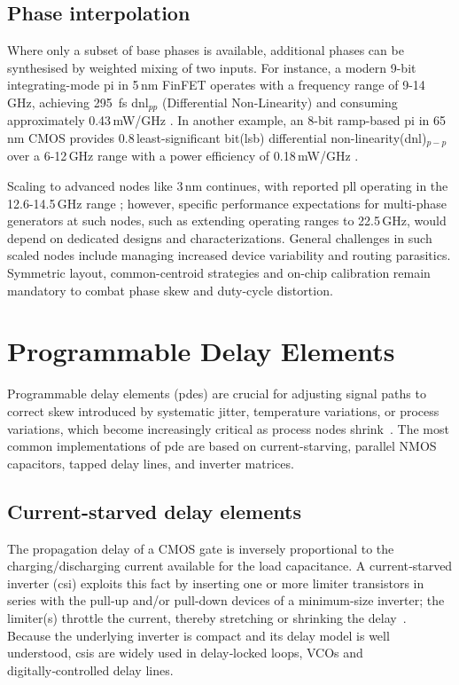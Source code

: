 \subsection{Phase interpolation}
Where only a subset of base phases is available, additional phases can be synthesised by weighted mixing of two inputs.
For instance, a modern 9-bit integrating-mode \gls{pi} in 5\,nm FinFET operates with a frequency range of 9-14\,GHz, achieving \SI{295}{\femto\second} \gls{dnl}$_{pp}$ (Differential Non-Linearity) and consuming approximately 0.43\,mW/GHz \cite{Mishra2022ISSCC}. In another example, an 8-bit ramp-based \gls{pi} in 65\,nm CMOS provides 0.8\,least-significant bit(\gls{lsb}) differential non-linearity(\gls{dnl})$_{p-p}$ over a 6-12\,GHz range with a power efficiency of 0.18\,mW/GHz \cite{Mohapatra2024ISSCC}.

Scaling to advanced nodes like 3\,nm continues, with reported \gls{pll} operating in the 12.6-14.5\,GHz range \cite{Lu2022JSSC}; however, specific performance expectations for multi-phase generators at such nodes, such as extending operating ranges to 22.5\,GHz, would depend on dedicated designs and characterizations. General challenges in such scaled nodes include managing increased device variability and routing parasitics.
Symmetric layout, common-centroid strategies and on-chip calibration remain mandatory to combat phase skew and duty-cycle distortion.


\section{Programmable Delay Elements}
Programmable delay elements (\glspl{pde}) are crucial for adjusting signal paths to correct skew introduced by systematic jitter, temperature variations, or process variations, which become increasingly critical as process nodes shrink~\cite{horowitz2005scaling, caignet2001challenge, lee2011self, Park2021, abdulrazzaq2016review}. The most common implementations of \gls{pde} are based on current-starving, parallel NMOS capacitors, tapped delay lines, and inverter matrices.

\subsection{Current-starved delay elements}
The propagation delay of a CMOS gate is inversely proportional to the charging/discharging current available for the load capacitance.  A current‑starved inverter (\gls{csi}) exploits this fact by inserting one or more limiter transistors in series with the pull‑up and/or pull‑down devices of a minimum‑size inverter; the limiter(s) throttle the current, thereby stretching or shrinking the delay~\cite{maymandi2003digitally}.  Because the underlying inverter is compact and its delay model is well understood, \glspl{csi} are widely used in delay‑locked loops, VCOs and digitally‑controlled delay lines.

